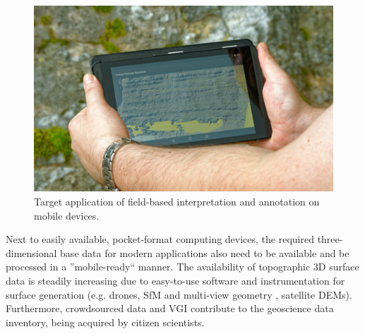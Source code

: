 \documentclass[review]{elsarticle}
\begin{document}
\begin{figure}[htbp]
\begin{center}
	\includegraphics[width=0.95\linewidth]{graphics/GRIT_overhands}
	\caption{Target application of field-based interpretation and annotation on mobile devices.}
	\label{fig:intro:mobileInterpretationInField}
\end{center}
\end{figure}


Next to easily available, pocket-format computing devices, the required three-dimensional base data for modern applications also need to be available and be processed in a ''mobile-ready`` manner. The availability of topographic 3D surface data is steadily increasing due to easy-to-use software and instrumentation for surface generation (e.g. drones, \gls{SfM} \cite{Wu2013} and multi-view geometry \cite{Goesele2007}, satellite \glspl{DEM}). Furthermore, crowdsourced data and \gls{VGI} contribute to the geoscience data inventory, being acquired by citizen scientists. %
\end{document}

